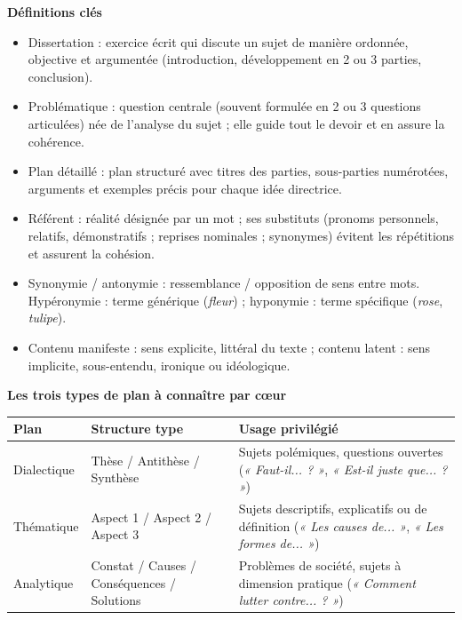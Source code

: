 \documentclass[11pt]{article}
\newcommand{\cle}[1]{{\popxbold\color{popdark}#1}}
\begin{document}
\begin{bilan}
\textbf{Définitions clés}
\begin{itemize}
  \item \cle{Dissertation} : exercice écrit qui discute un sujet de manière ordonnée, objective et argumentée (introduction, développement en 2 ou 3 parties, conclusion).
  \item \cle{Problématique} : question centrale (souvent formulée en 2 ou 3 questions articulées) née de l'analyse du sujet ; elle guide tout le devoir et en assure la cohérence.
  \item \cle{Plan détaillé} : plan structuré avec titres des parties, sous-parties numérotées, arguments et exemples précis pour chaque idée directrice.
  \item \cle{Référent} : réalité désignée par un mot ; ses \cle{substituts} (pronoms personnels, relatifs, démonstratifs ; reprises nominales ; synonymes) évitent les répétitions et assurent la cohésion.
  \item \cle{Synonymie} / \cle{antonymie} : ressemblance / opposition de sens entre mots. \cle{Hypéronymie} : terme générique (\emph{fleur}) ; \cle{hyponymie} : terme spécifique (\emph{rose}, \emph{tulipe}).
  \item \cle{Contenu manifeste} : sens explicite, littéral du texte ; \cle{contenu latent} : sens implicite, sous-entendu, ironique ou idéologique.
\end{itemize}

\textbf{Les trois types de plan à connaître par c\oe ur}
\begin{center}
\begin{tabularx}{\linewidth}{|l|X|X|}
\hline
\rowcolor{popblueL} \textbf{Plan} & \textbf{Structure type} & \textbf{Usage privilégié} \\
\hline
Dialectique & Thèse / Antithèse / Synthèse & Sujets polémiques, questions ouvertes (\emph{« Faut-il... ? »}, \emph{« Est-il juste que... ? »}) \\
\hline
Thématique & Aspect 1 / Aspect 2 / Aspect 3 & Sujets descriptifs, explicatifs ou de définition (\emph{« Les causes de... »}, \emph{« Les formes de... »}) \\
\hline
Analytique & Constat / Causes / Conséquences / Solutions & Problèmes de société, sujets à dimension pratique (\emph{« Comment lutter contre... ? »}) \\
\hline
\end{tabularx}
\end{center}


\end{bilan}
\end{document}
